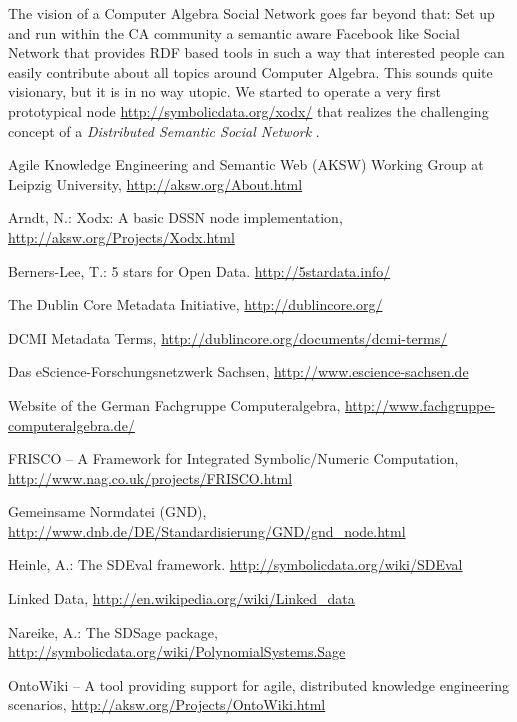 \documentclass{svmult}
\begin{document}
The vision of a Computer Algebra Social Network goes far beyond that: Set up
and run within the CA community a semantic aware Facebook like Social Network
that provides RDF based tools in such a way that interested people can easily
contribute about all topics around Computer Algebra.  This sounds quite
visionary, but it is in no way utopic. We started to operate a very first
prototypical node \url{http://symbolicdata.org/xodx/} \cite{xodx} that
realizes the challenging concept of a \emph{Distributed Semantic Social
  Network} \cite{DSSN}.

\raggedright
\begin{thebibliography}{1}

 Agile Knowledge Engineering and Semantic Web (AKSW) Working
  Group at Leipzig University, \url{http://aksw.org/About.html}

 Arndt, N.: Xodx: A basic DSSN node implementation,
  \url{http://aksw.org/Projects/Xodx.html}

 Berners-Lee, T.: 5 stars for Open Data.
  \url{http://5stardata.info/}

 The Dublin Core Metadata Initiative, \url{http://dublincore.org/}

 DCMI Metadata Terms, 
  \url{http://dublincore.org/documents/dcmi-terms/} 

 Das eScience-Forschungsnetzwerk Sachsen, 
  \newblock \url{http://www.escience-sachsen.de} 

 Website of the German Fachgruppe Computeralgebra,   
  \url{http://www.fachgruppe-computeralgebra.de/} 

 FRISCO -- A Framework for Integrated Symbolic/Numeric
  Computation, \url{http://www.nag.co.uk/projects/FRISCO.html} 

 Gemeinsame Normdatei (GND), 
  \url{http://www.dnb.de/DE/Standardisierung/GND/gnd_node.html}

 Heinle, A.: The SDEval framework.  
  \url{http://symbolicdata.org/wiki/SDEval}

 Linked Data, \url{http://en.wikipedia.org/wiki/Linked_data}

 Nareike, A.: The SDSage package, 
  \url{http://symbolicdata.org/wiki/PolynomialSystems.Sage}

 OntoWiki -- A tool providing support for agile, distributed
  knowledge engineering scenarios, 
  \url{http://aksw.org/Projects/OntoWiki.html} 


\end{thebibliography}
\end{document}
